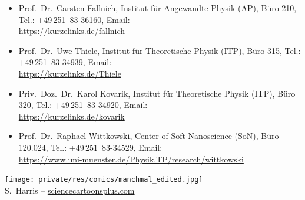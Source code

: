 \begin{multicols}{2}
\begin{itemize}
\item Prof.\ Dr.\ Carsten Fallnich, Institut für Angewandte Physik (AP), Büro 210, Tel.: +49\,251~83-36160, Email:  \\ \url{https://kurzelinks.de/fallnich} 

\item Prof.\ Dr.\ Uwe Thiele, Institut für Theoretische Physik (ITP), Büro 315,  Tel.: +49\,251~83-34939, Email:  \\ \url{https://kurzelinks.de/Thiele} 

\item Priv.\ Doz.\ Dr.\ Karol Kovarik, Institut für Theoretische Physik (ITP), Büro 320, Tel.: +49\,251~83-34920, Email:  \\ \url{https://kurzelinks.de/kovarik} 

\item Prof.\ Dr.\ Raphael Wittkowski, Center of Soft Nanoscience (SoN), Büro 120.024, Tel.: +49\,251~83-34529, Email:  \\ \url{https://www.uni-muenster.de/Physik.TP/research/wittkowski} 
\end{itemize}

\begin{center}
\texttt{[image: private/res/comics/manchmal\_edited.jpg]}\\
{\footnotesize 
S.~Harris – \url{sciencecartoonsplus.com}
}
\end{center}

\end{multicols}

\vfill

\newpage


